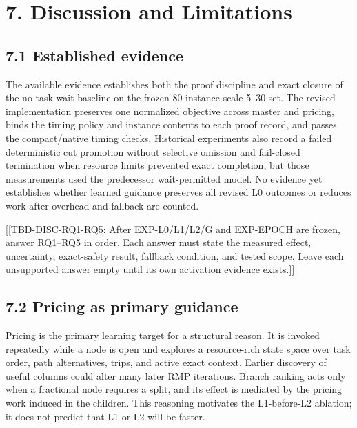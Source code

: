 \documentclass[
  11pt,
]{article}
\begin{document}
\hypertarget{discussion-and-limitations}{%
\section{7. Discussion and
Limitations}\label{discussion-and-limitations}}

\hypertarget{established-evidence}{%
\subsection{7.1 Established evidence}\label{established-evidence}}

The available evidence establishes both the proof discipline and exact
closure of the no-task-wait baseline on the frozen 80-instance
scale-5--30 set. The revised implementation preserves one normalized
objective across master and pricing, binds the timing policy and
instance contents to each proof record, and passes the compact/native
timing checks. Historical experiments also record a failed deterministic
cut promotion without selective omission and fail-closed termination
when resource limits prevented exact completion, but those measurements
used the predecessor wait-permitted model. No evidence yet establishes
whether learned guidance preserves all revised L0 outcomes or reduces
work after overhead and fallback are counted.

{[}{[}TBD-DISC-RQ1-RQ5: After EXP-L0/L1/L2/G and EXP-EPOCH are frozen,
answer RQ1--RQ5 in order. Each answer must state the measured effect,
uncertainty, exact-safety result, fallback condition, and tested scope.
Leave each unsupported answer empty until its own activation evidence
exists.{]}{]}

\hypertarget{pricing-as-primary-guidance}{%
\subsection{7.2 Pricing as primary
guidance}\label{pricing-as-primary-guidance}}

Pricing is the primary learning target for a structural reason. It is
invoked repeatedly while a node is open and explores a resource-rich
state space over task order, path alternatives, trips, and active exact
context. Earlier discovery of useful columns could alter many later RMP
iterations. Branch ranking acts only when a fractional node requires a
split, and its effect is mediated by the pricing work induced in the
children. This reasoning motivates the L1-before-L2 ablation; it does
not predict that L1 or L2 will be faster.
\end{document}
